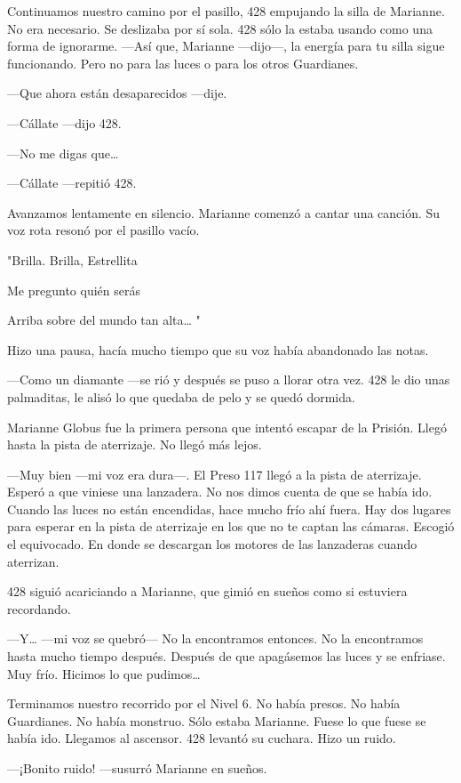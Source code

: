 Continuamos nuestro camino por el pasillo, 428 empujando la silla de
Marianne. No era necesario. Se deslizaba por sí sola. 428 sólo la estaba
usando como una forma de ignorarme. ---Así que, Marianne ---dijo---, la
energía para tu silla sigue funcionando. Pero no para las luces o para
los otros Guardianes.

---Que ahora están desaparecidos ---dije.

---Cállate ---dijo 428.

---No me digas que\ldots{}

---Cállate ---repitió 428.

Avanzamos lentamente en silencio. Marianne comenzó a cantar una canción.
Su voz rota resonó por el pasillo vacío.

"Brilla. Brilla, Estrellita

Me pregunto quién serás

Arriba sobre del mundo tan alta\ldots{} "

Hizo una pausa, hacía mucho tiempo que su voz había abandonado las
notas.

---Como un diamante ---se rió y después se puso a llorar otra vez. 428
le dio unas palmaditas, le alisó lo que quedaba de pelo y se quedó
dormida.

Marianne Globus fue la primera persona que intentó escapar de la
Prisión. Llegó hasta la pista de aterrizaje. No llegó más lejos.

---Muy bien ---mi voz era dura---. El Preso 117 llegó a la pista de
aterrizaje. Esperó a que viniese una lanzadera. No nos dimos cuenta de
que se había ido. Cuando las luces no están encendidas, hace mucho frío
ahí fuera. Hay dos lugares para esperar en la pista de aterrizaje en los
que no te captan las cámaras. Escogió el equivocado. En donde se
descargan los motores de las lanzaderas cuando aterrizan.

428 siguió acariciando a Marianne, que gimió en sueños como si estuviera
recordando.

---Y\ldots{} ---mi voz se quebró--- No la encontramos entonces. No la
encontramos hasta mucho tiempo después. Después de que apagásemos las
luces y se enfriase. Muy frío. Hicimos lo que pudimos\ldots{}

Terminamos nuestro recorrido por el Nivel 6. No había presos. No había
Guardianes. No había monstruo. Sólo estaba Marianne. Fuese lo que fuese
se había ido. Llegamos al ascensor. 428 levantó su cuchara. Hizo un
ruido.

---¡Bonito ruido! ---susurró Marianne en sueños.

